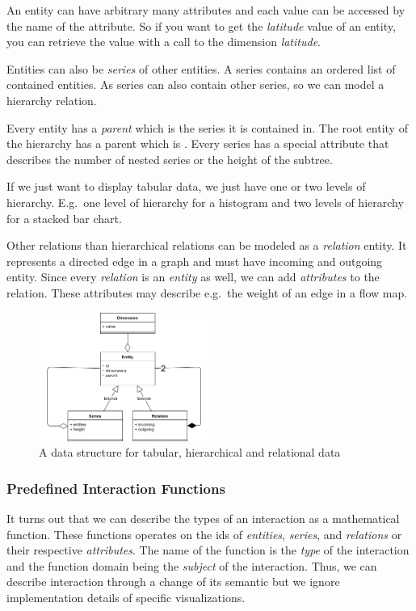 \documentclass{article}
\newcommand{\attr}[1]{\texttt{\detokenize{#1}}}
\begin{document}
An entity can have arbitrary many attributes and each value can be accessed by the name of the attribute.
So if you want to get the \emph{latitude} value of an entity, you can retrieve the value with a call to the dimension \emph{latitude}.

Entities can also be \emph{series} of other entities.
A series contains an ordered list of contained entities.
As series can also contain other series, so we can model a hierarchy relation.

Every entity has a \emph{parent} which is the series it is contained in.
The root entity of the hierarchy has a parent which is \attr{nil}.
Every series has a special attribute \attr{height} that describes the number of nested series or the height of the subtree.

If we just want to display tabular data, we just have one or two levels of hierarchy.
E.g.\ one level of hierarchy for a histogram and two levels of hierarchy for a stacked bar chart.

Other relations than hierarchical relations can be modeled as a \emph{relation} entity.
It represents a directed edge in a graph and must have incoming and outgoing entity.
Since every \emph{relation} is an \emph{entity} as well, we can add \emph{attributes} to the relation.
These attributes may describe e.g.\ the weight of an edge in a flow map.


\begin{figure}[h!]
  \centering
  \includegraphics[width=0.5\textwidth]{images/concept/shared-data-model.png}
  \caption{%
    A data structure for tabular, hierarchical and relational data
  }\label{fig:concept:shared-data-model}
\end{figure}

\subsubsection{Predefined Interaction Functions}\label{sec:concept:types}

It turns out that we can describe the types of an interaction as a mathematical function.
These functions operates on the ids of \emph{entities}, \emph{series}, and \emph{relations} or their respective \emph{attributes}.
The name of the function is the \emph{type} of the interaction and the function domain being the \emph{subject} of the interaction.
Thus, we can describe interaction through a change of its semantic but we ignore implementation details of specific visualizations.
\end{document}

